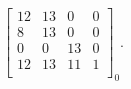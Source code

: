 $$
\left[
\begin{array}{cccc}
12& 13&  0&  0 \\
 8& 13&  0&  0 \\
 0&  0& 13&  0 \\
12& 13& 11&  1 \\
\end{array}
\right]_0.
$$
